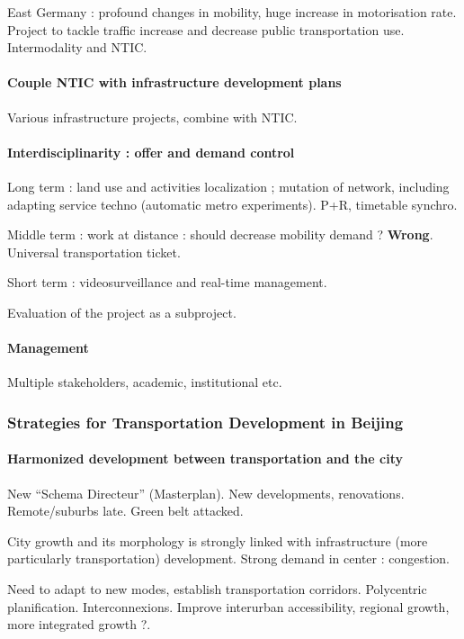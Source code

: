 East Germany : profound changes in mobility, huge increase in motorisation rate. Project to tackle traffic increase and decrease public transportation use. Intermodality and NTIC.

\paragraph{Couple NTIC with infrastructure development plans}

Various infrastructure projects, combine with NTIC.

\paragraph{Interdisciplinarity : offer and demand control}

Long term : land use and activities localization ; mutation of network, including adapting service techno (automatic metro experiments). P+R, timetable synchro.

Middle term : work at distance : should decrease mobility demand ? \textbf{Wrong}. Universal transportation ticket.

Short term : videosurveillance and real-time management.

Evaluation of the project as a subproject.

\paragraph{Management}

Multiple stakeholders, academic, institutional etc.


\subsubsection{Strategies for Transportation Development in Beijing}

\paragraph{Harmonized development between transportation and the city}

New ``Schema Directeur'' (Masterplan). New developments, renovations. Remote/suburbs late. Green belt attacked.

City growth and its morphology is strongly linked with infrastructure (more particularly transportation) development. Strong demand in center : congestion.

Need to adapt to new modes, establish transportation corridors. Polycentric planification. Interconnexions. Improve interurban accessibility, regional growth, more integrated growth ?.

